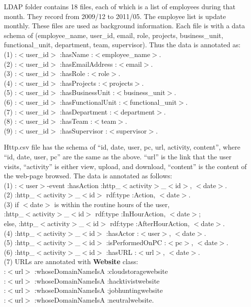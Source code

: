 LDAP folder contains 18 files, each of which is a list of employees during that month.
They record from 2009/12 to 2011/05.
The employee list is update monthly.
These files are used as background information. 
Each file is with a data schema of (employee\_name, user\_id, email, role, projects, business\_unit, functional\_unit, department, team, supervisor).
Thus the data is annotated as: \\
(1) :$<$user\_id$>$ :hasName :$<$employee\_name$>$. \\
(2) :$<$user\_id$>$ :hasEmailAddress :$<$email$>$. \\
(3) :$<$user\_id$>$ :hasRole :$<$role$>$. \\
(4) :$<$user\_id$>$ :hasProjects :$<$projects$>$. \\
(5) :$<$user\_id$>$ :hasBusinessUnit :$<$business\_unit$>$. \\
(6) :$<$user\_id$>$ :hasFunctionalUnit :$<$functional\_unit$>$. \\
(7) :$<$user\_id$>$ :hasDepartment :$<$department$>$. \\
(8) :$<$user\_id$>$ :hasTeam :$<$team$>$. \\
(9) :$<$user\_id$>$ :hasSupervisor :$<$supervisor$>$.

Http.csv file has the schema of ``id, date, user, pc, url, activity, content'', where ``id, date, user, pc'' are the same as the above. 
``url'' is the link that the user visits, ``activity'' is either view, upload, and download, ``content'' is the content of the web-page browsed. 
The data is annotated as follows:\\
(1) :$<$user$>$-event :hasAction :http\_$<$activity$>$\_$<$id$>$, $<$date$>$.\\
(2) :http\_$<$activity$>$\_$<$id$>$ rdf:type :Action, $<$date$>$.\\
(3) if $<$date$>$ is within the routine hours of the user, \\
:http\_$<$activity$>$\_$<$id$>$ rdf:type :InHourAction, $<$date$>$;\\
else, :http\_$<$activity$>$\_$<$id$>$ rdf:type :AfterHourAction, $<$date$>$.\\
(4) :http\_$<$activity$>$\_$<$id$>$ :hasActor :$<$user$>$, $<$date$>$.\\
(5) :http\_$<$activity$>$\_$<$id$>$ :isPerformedOnPC :$<$pc$>$, $<$date$>$.\\
(6) :http\_$<$activity$>$\_$<$id$>$ :hasURL :$<$url$>$, $<$date$>$.\\
(7) URLs are annotated with \textbf{Website} class: \\
:$<$url$>$ :whoseDomainNameIsA :cloudstoragewebsite \\
:$<$url$>$ :whoseDomainNameIsA :hacktivistwebsite \\
:$<$url$>$ :whoseDomainNameIsA :jobhuntingwebsite \\
:$<$url$>$ :whoseDomainNameIsA :neutralwebsite.
%
